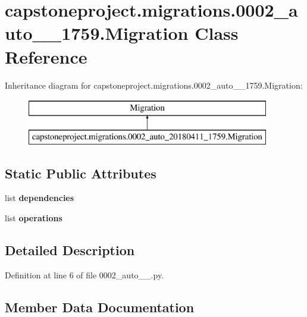\hypertarget{classcapstoneproject_1_1migrations_1_10002__auto__20180411__1759_1_1_migration}{}\section{capstoneproject.\+migrations.0002\+\_\+auto\+\_\+\_\+1759.Migration Class Reference}
\label{classcapstoneproject_1_1migrations_1_10002__auto__20180411__1759_1_1_migration}
Inheritance diagram for capstoneproject.\+migrations.0002\+\_\+auto\+\_\+\_\+1759.Migration\+:\begin{figure}[H]
\begin{center}
\leavevmode
\includegraphics[height=2.000000cm]{classcapstoneproject_1_1migrations_1_10002__auto__20180411__1759_1_1_migration}
\end{center}
\end{figure}
\subsection*{Static Public Attributes}
\begin{DoxyCompactItemize}
\item 
list {\bfseries dependencies}
\item 
list {\bfseries operations}
\end{DoxyCompactItemize}


\subsection{Detailed Description}


Definition at line 6 of file 0002\+\_\+auto\+\_\+\_.\+py.



\subsection{Member Data Documentation}
\mbox{\label{classcapstoneproject_1_1migrations_1_10002__auto__20180411__1759_1_1_migration_ab8408dbcbbe31f9e377df2bad748fa02}} 
